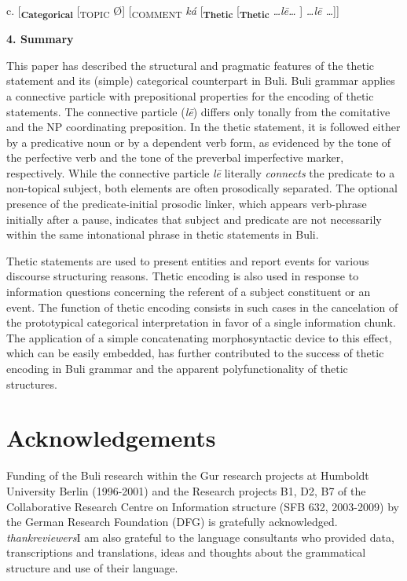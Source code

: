 \documentclass[output=paper]{langsci/langscibook}
\begin{document}
    c.   [\textbf{\textsubscript{Categorical}}\textsubscript{ }[\textsubscript{TOPIC }Ø]\textsubscript{ }[\textsubscript{COMMENT}\textit{ ká} [\textbf{\textsubscript{Thetic}}\textsubscript{  }[\textbf{\textsubscript{Thetic}} \textit{…l\={e}… }] \textit{…l\={e} …}]]

\textbf{4. Summary}

This paper has described the structural and pragmatic features of the thetic statement and its (simple) categorical counterpart in Buli. Buli grammar applies a connective particle with prepositional properties for the encoding of thetic statements. The connective particle (\textit{l\={e}})\textit{ }differs only tonally from the comitative and the NP coordinating preposition. In the thetic statement, it is followed either by a predicative noun or by a dependent verb form, as evidenced by the tone of the perfective verb and the tone of the preverbal imperfective marker, respectively. While the connective particle\textit{ l\={e} }literally \textit{connects} the predicate to a non-topical subject, both elements are often prosodically separated. The optional presence of the predicate-initial prosodic linker, which appears verb-phrase initially after a pause, indicates that subject and predicate are not necessarily within the same intonational phrase in thetic statements in Buli. 

Thetic statements are used to present entities and report events for various discourse structuring reasons. Thetic encoding is also used in response to information questions concerning the referent of a subject constituent or an event. The function of thetic encoding consists in such cases in the cancelation of the prototypical categorical interpretation in favor of a single information chunk. The application of a simple concatenating morphosyntactic device to this effect, which can be easily embedded, has further contributed to the success of thetic encoding in Buli grammar and the apparent polyfunctionality of thetic structures. 

\section{ Acknowledgements }

Funding of the Buli research within the Gur research projects at Humboldt University Berlin (1996-2001) and the Research projects B1, D2, B7 of the Collaborative Research Centre on Information structure (SFB 632, 2003-2009) by the German Research Foundation (DFG) is gratefully acknowledged. \emph{\textup{thank}}\emph{\textup{reviewers}}I am also grateful to the language consultants who provided data, transcriptions and translations, ideas and thoughts about the grammatical structure and use of their language.
\end{document}
